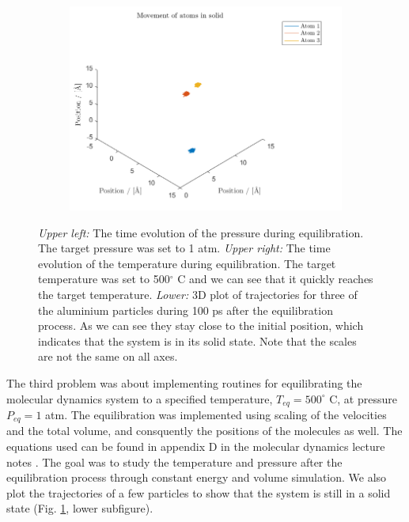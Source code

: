 \begin{figure}[H]
\begin{subfigure}[b]{0.40\textwidth}
    \end{subfigure}
    \begin{subfigure}[b]{0.40\textwidth}
        \centering
        \includegraphics[width=\textwidth]{graphics/task3/traj.png}
    \end{subfigure}
    \caption{\textit{Upper left:} The time evolution of the pressure during equilibration. The target pressure was set to 1 atm. \textit{Upper right:} The time evolution of the temperature during equilibration. The target temperature was set to 500$^\circ$ C and we can see that it quickly reaches the target temperature. \textit{Lower:} 3D plot of trajectories for three of the aluminium particles during 100 ps after the equilibration process. As we can see they stay close to the initial position, which indicates that the system is in its solid state. Note that the scales are not the same on all axes.}
    \label{fig:equilibrium500}
\end{figure}

The third problem was about implementing routines for equilibrating the molecular dynamics system to a specified temperature, $T_{eq} = 500^\circ$ C, at pressure $P_{eq} = 1$ atm. The equilibration was implemented using scaling of the velocities and the total volume, and consquently the positions of the molecules as well. The equations used can be found in appendix D in the molecular dynamics lecture notes \cite{lecnotes}. The goal was to study the temperature and pressure after the equilibration process through constant energy and volume simulation. We also plot the trajectories of a few particles to show that the system is still in a solid state (Fig. \ref{fig:equilibrium500}, lower subfigure).

